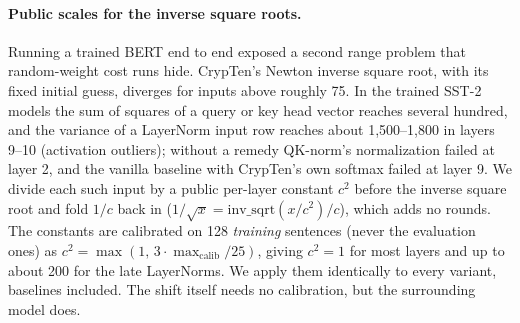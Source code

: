 \documentclass[11pt]{article}
\begin{document}
\paragraph{Public scales for the inverse square roots.} Running a trained BERT end to end exposed a second range problem that
random-weight cost runs hide. CrypTen's Newton inverse square root, with its fixed initial guess, diverges for inputs above
roughly 75. In the trained SST-2 models the sum of squares of a query or key head vector reaches several hundred, and the
variance of a LayerNorm input row reaches about 1,500--1,800 in layers 9--10 (activation outliers); without a remedy
QK-norm's normalization failed at layer 2, and the vanilla baseline with CrypTen's own softmax failed at layer 9. We divide each
such input by a public per-layer constant $c^2$ before the inverse square root and fold $1/c$ back in
($1/\sqrt{x}=\mathrm{inv\_sqrt}(x/c^2)/c$), which adds no rounds. The constants are calibrated on 128 \emph{training}
sentences (never the evaluation ones) as $c^2=\max(1,\,3\cdot\max_{\mathrm{calib}}/25)$, giving $c^2=1$ for most layers and up
to about 200 for the late LayerNorms. We apply them identically to every variant, baselines included. The shift itself needs no
calibration, but the surrounding model does.
\end{document}
